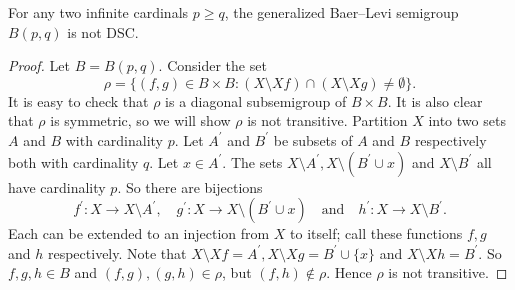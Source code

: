 \documentclass[10pt,a4paper]{amsart}
\begin{document}
\begin{thm}\label{Baer Levi}
    For any two infinite cardinals $p \geq q$, the generalized Baer--Levi semigroup $B(p,q)$ is not DSC.
\end{thm}

\begin{proof}
    Let $B = B(p,q)$.
    Consider the set 
    \[
    \rho = \bigl\{ (f,g) \in B \times B \colon (X \setminus X f) \cap (X \setminus X g) \neq \emptyset \bigr\}.
    \]
     It is easy to check that $\rho$ is a diagonal subsemigroup of $B \times B$. It is also clear that $\rho$ is symmetric, so we will show $\rho$ is not transitive.
    Partition $X$ into two sets $A$ and $B$ with cardinality $p$. Let $A^\prime$ and $ B^\prime$ be subsets of $A$ and $B$ respectively both with cardinality $q$.
    Let $x \in A^\prime$. The sets $X \setminus A^\prime , X \setminus (B^\prime \cup {x} )$ and $X \setminus B^\prime$ all have cardinality $p$. 
    So there are bijections 
    \[
    f^\prime\colon X \to X \setminus A^\prime ,\quad  g^\prime \colon X \to X \setminus (B^\prime \cup {x})\quad \text{and}\quad h^\prime \colon  X \to X \setminus B^\prime.
    \] 
    Each can be extended to an injection from $X$ to itself; call these functions $f,g$ and $h$ respectively.
    Note that $X\setminus Xf = A^\prime, X\setminus Xg = B^\prime \cup \{ x \}$ and $X\setminus Xh = B^\prime$. So $f,g,h \in B$ and $(f,g),(g,h) \in \rho$, but $(f,h) \notin \rho$. Hence $\rho$ is not transitive.
\end{proof}
\end{document}
